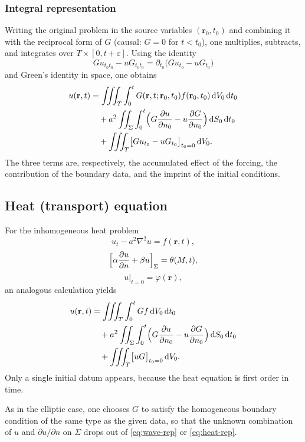 \subsubsection{Integral representation}

Writing the original problem in the source variables $(\mathbf{r}_0,t_0)$ and combining it with the reciprocal form of $G$ (causal: $G=0$ for $t<t_0$), one multiplies, subtracts, and integrates over $T\times[0,t+\varepsilon]$. Using the identity
\begin{equation}
G u_{t_0t_0}-u G_{t_0t_0}
=\partial_{t_0}\bigl(G u_{t_0}-u G_{t_0}\bigr)
\end{equation}
and Green's identity in space, one obtains
\begin{equation}
\label{eq:wave-rep}
\begin{aligned}
u(\mathbf{r},t)
&=\iiint_{T}\int_0^{t}G(\mathbf{r},t;\mathbf{r}_0,t_0)f(\mathbf{r}_0,t_0)\,\mathrm{d}V_0\,\mathrm{d}t_0\\
&\quad+a^2\iint_{\Sigma}\int_0^{t}
\Bigl(G\frac{\partial u}{\partial n_0}-u\frac{\partial G}{\partial n_0}\Bigr)
\,\mathrm{d}S_0\,\mathrm{d}t_0\\
&\quad+\iiint_{T}\bigl[G u_{t_0}-u G_{t_0}\bigr]_{t_0=0}\,\mathrm{d}V_0.
\end{aligned}
\end{equation}
The three terms are, respectively, the accumulated effect of the forcing, the contribution of the boundary data, and the imprint of the initial conditions.

\subsection{Heat (transport) equation}

For the inhomogeneous heat problem
\begin{equation}
u_t-a^2\nabla^2 u=f(\mathbf{r},t),
\end{equation}
\begin{equation}
\Bigl[\alpha\frac{\partial u}{\partial n}+\beta u\Bigr]_{\Sigma}=\theta(M,t),
\end{equation}
\begin{equation}
u\big|_{t=0}=\varphi(\mathbf{r}),
\end{equation}
an analogous calculation yields
\begin{equation}
\label{eq:heat-rep}
\begin{aligned}
u(\mathbf{r},t)
&=\iiint_{T}\int_0^{t}Gf\,\mathrm{d}V_0\,\mathrm{d}t_0\\
&\quad+a^2\iint_{\Sigma}\int_0^{t}
\Bigl(G\frac{\partial u}{\partial n_0}-u\frac{\partial G}{\partial n_0}\Bigr)
\,\mathrm{d}S_0\,\mathrm{d}t_0\\
&\quad+\iiint_{T}\bigl[uG\bigr]_{t_0=0}\,\mathrm{d}V_0.
\end{aligned}
\end{equation}
Only a single initial datum appears, because the heat equation is first order in time.

\begin{note}
As in the elliptic case, one chooses $G$ to satisfy the homogeneous boundary condition of the same type as the given data, so that the unknown combination of $u$ and $\partial u/\partial n$ on $\Sigma$ drops out of \eqref{eq:wave-rep} or \eqref{eq:heat-rep}.
\end{note}
